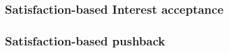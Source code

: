 


 


\subsubsection{\textbf{Satisfaction-based Interest acceptance}}
\label{sec:probabilistic}

 


\subsubsection{\textbf{Satisfaction-based pushback}}
\label{sec:dynamic limits}

 




